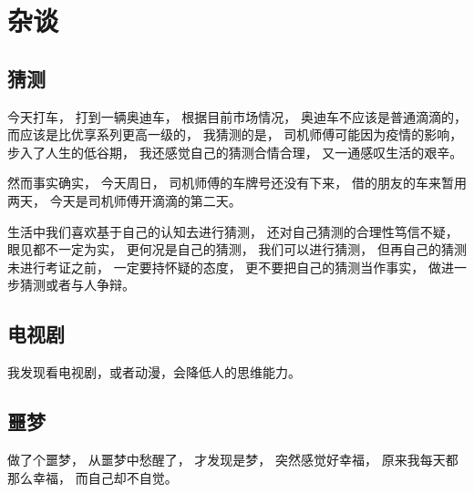 
\chapter{杂谈}

\section{猜测}


今天打车，
打到一辆奥迪车，
根据目前市场情况，
奥迪车不应该是普通滴滴的，
而应该是比优享系列更高一级的，
我猜测的是，
司机师傅可能因为疫情的影响，
步入了人生的低谷期，
我还感觉自己的猜测合情合理，
又一通感叹生活的艰辛。

然而事实确实，
今天周日，
司机师傅的车牌号还没有下来，
借的朋友的车来暂用两天，
今天是司机师傅开滴滴的第二天。


生活中我们喜欢基于自己的认知去进行猜测，
还对自己猜测的合理性笃信不疑，
眼见都不一定为实，
更何况是自己的猜测，
我们可以进行猜测，
但再自己的猜测未进行考证之前，
一定要持怀疑的态度，
更不要把自己的猜测当作事实，
做进一步猜测或者与人争辩。


\section{电视剧}

我发现看电视剧，或者动漫，会降低人的思维能力。

\section{噩梦}

做了个噩梦，
从噩梦中愁醒了，
才发现是梦，
突然感觉好幸福，
原来我每天都那么幸福，
而自己却不自觉。
